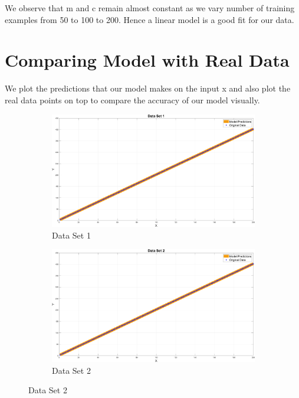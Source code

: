 \documentclass[14pt]{article}
\begin{document}
    We observe that m and c remain almost constant as we vary number of training examples from 50 to 100 to 200. Hence a linear model is a good fit for our data.


    \huge
    \section{Comparing Model with Real Data}
    \normalsize
    We plot the predictions that our model makes on the input x and also plot the real data points on top to compare the accuracy of our model visually.
    \begin{figure}[!h]
        \centering
        \begin{subfigure}{\textwidth}
            \centering
            \includegraphics[width = \textwidth]{Images/Table_data1.png}
            \caption{Data Set 1}
        \end{subfigure}
        \begin{subfigure}{\textwidth}
            \centering
            \includegraphics[width = \textwidth]{Images/Table_data2.png}
            \caption{Data Set 2}
        \end{subfigure}
    \end{figure}
\end{document}
